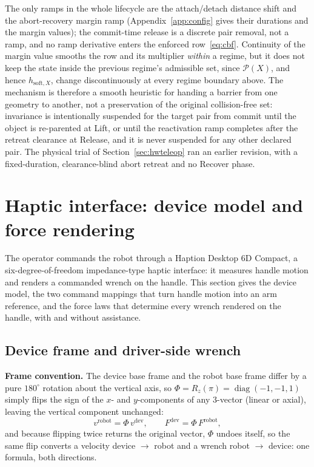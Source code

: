 \documentclass[12pt,a4paper,twoside,openright]{report}
\begin{document}
The only ramps in the whole lifecycle are the attach/detach distance shift and the abort-recovery margin ramp (Appendix~\ref{app:config} gives their durations and the margin values); the commit-time release is a discrete pair removal, not a ramp, and no ramp derivative enters the enforced row~\eqref{eq:cbf}. Continuity of the margin value smooths the row and its multiplier \emph{within} a regime, but it does not keep the state inside the previous regime's admissible set, since $\mathcal{P}(X)$, and hence $h_{\text{soft},X}$, change discontinuously at every regime boundary above. The mechanism is therefore a smooth heuristic for handing a barrier from one geometry to another, not a preservation of the original collision-free set: invariance is intentionally suspended for the target pair from commit until the object is re-parented at Lift, or until the reactivation ramp completes after the retreat clearance at Release, and it is never suspended for any other declared pair. The physical trial of Section~\ref{sec:hwteleop} ran an earlier revision, with a fixed-duration, clearance-blind abort retreat and no Recover phase.

\section{Haptic interface: device model and force rendering}
\label{sec:teleop}

The operator commands the robot through a Haption Desktop 6D Compact, a six-degree-of-freedom impedance-type haptic interface: it measures handle motion and renders a commanded wrench on the handle. This section gives the device model, the two command mappings that turn handle motion into an arm reference, and the force laws that determine every wrench rendered on the handle, with and without assistance.

\subsection{Device frame and driver-side wrench}
\label{sec:device}

\textbf{Frame convention.} The device base frame and the robot base frame differ by a pure $180^{\circ}$ rotation about the vertical axis, so $\Phi = R_z(\pi) = \operatorname{diag}(-1,-1,1)$ simply flips the sign of the $x$- and $y$-components of any 3-vector (linear or axial), leaving the vertical component unchanged:
\begin{equation}
v^{\text{robot}} = \Phi\, v^{\text{dev}},
\qquad
F^{\text{dev}} = \Phi\, F^{\text{robot}},
\label{eq:flip}
\end{equation}
and because flipping twice returns the original vector, $\Phi$ undoes itself, so the same flip converts a velocity device $\to$ robot and a wrench robot $\to$ device: one formula, both directions.
\end{document}
